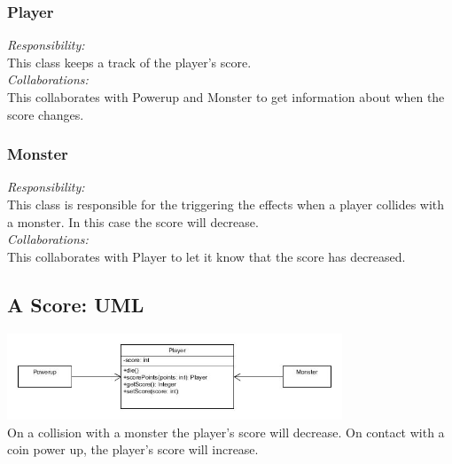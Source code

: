 \subsubsection{Player}
\textit{Responsibility:} \\
This class keeps a track of the player's score.\\
\textit{Collaborations:} \\
This collaborates with Powerup and Monster to get information about when the score changes.

\subsubsection{Monster}
\textit{Responsibility:} \\
This class is responsible for the triggering the effects when a player collides with a monster. In this case the score will decrease. \\
\textit{Collaborations:} \\
This collaborates with Player to let it know that the score has decreased.

\subsection{A Score: UML}

\includegraphics[width=100mm]{uml_score.jpg}\\[1cm]

On a collision with a monster the player's score will decrease. On contact with a coin power up, the player's score will increase.